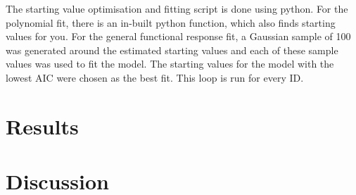 \documentclass[11pt, a4paper, titlepage]{article}
\begin{document}
The starting value optimisation and fitting script is done using python. For the polynomial fit, there is an in-built python function, which also finds starting values for you. For the general functional response fit, a Gaussian sample of 100 was generated around the estimated starting values and each of these sample values was used to fit the model. The starting values for the model with the lowest AIC were chosen as the best fit. This loop is run for every ID.

\section{Results}

\section{Discussion}
\end{document}
